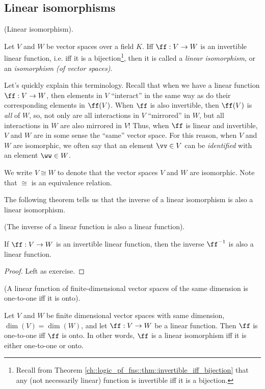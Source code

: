 \subsection*{Linear isomorphisms}

\begin{defn}
\label{ch::lin_alg::defn::linear_iso}
    (Linear isomorphism).
    
    Let $V$ and $W$ be vector spaces over a field $K$. Iff $\ff:V \rightarrow W$ is an invertible linear function, i.e. iff it is a bijection\footnote{Recall from Theorem \ref{ch::logic_pf_fns::thm::invertible_iff_bijection} that any (not necessarily linear) function is invertible iff it is a bijection.}, then it is called a \textit{linear isomorphism}, or an \textit{isomorphism (of vector spaces)}.
    
    Let's quickly explain this terminology. Recall that when we have a linear function $\ff:V \rightarrow W$, then elements in $V$ ``interact'' in the same way as do their corresponding elements in $\ff(V)$. When $\ff$ is also invertible, then $\ff(V)$ is \textit{all} of $W$, so, not only are all interactions in $V$ ``mirrored'' in $W$, but all interactions in $W$ are also mirrored in $V$! Thus, when $\ff$ is linear and invertible, $V$ and $W$ are in some sense the ``same'' vector space. For this reason, when $V$ and $W$ are isomorphic, we often say that an element $\vv \in V$ can be \textit{identified} with an element $\ww \in W$.
    
    We write $V \cong W$ to denote that the vector spaces $V$ and $W$ are isomorphic. Note that $\cong$ is an equivalence relation.
\end{defn}

The following theorem tells us that the inverse of a linear isomorphism is also a linear isomorphism.

\begin{theorem}
    (The inverse of a linear function is also a linear function).
    
    If $\ff:V \rightarrow W$ is an invertible linear function, then the inverse $\ff^{-1}$ is also a linear function.
\end{theorem}

\begin{proof}
     Left as exercise.
\end{proof}

\begin{theorem}
    \label{ch::lin_alg::thm::linear_fn_1-1_iff_onto}
    
    (A linear function of finite-dimensional vector spaces of the same dimension is one-to-one iff it is onto).
    
    Let $V$ and $W$ be finite dimensional vector spaces with same dimension, $\dim(V) = \dim(W)$, and let ${\ff:V \rightarrow W}$ be a linear function. Then $\ff$ is one-to-one iff $\ff$ is onto. In other words, $\ff$ is a linear isomorphism iff it is either one-to-one or onto.
\end{theorem}

